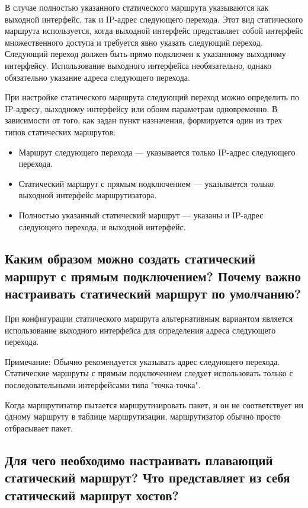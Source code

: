 В случае полностью указанного статического маршрута указываются
как выходной интерфейс, так и IP-адрес следующего перехода.
Этот вид статического маршрута используется,
когда выходной интерфейс представляет собой интерфейс множественного доступа
и требуется явно указать следующий переход.
Следующий переход должен быть прямо подключен
к указанному выходному интерфейсу.
Использование выходного интерфейса необязательно, однако
обязательно указание адреса следующего перехода.\par
При настройке статического маршрута следующий переход можно определить
по IP-адресу, выходному интерфейсу или обоим параметрам одновременно.
В зависимости от того, как задан пункт назначения,
формируется один из трех типов статических маршрутов:

\begin{itemize}
	\item Маршрут следующего перехода --- указывается только IP-адрес
		следующего перехода.
	\item Статический маршрут с прямым подключением --- указывается
		только выходной интерфейс маршрутизатора.
	\item Полностью указанный статический маршрут --- указаны и IP-адрес
		следующего перехода, и выходной интерфейс.
\end{itemize}

\subsection{Каким образом можно создать статический маршрут
	с прямым подключением?
	Почему важно настраивать статический маршрут по умолчанию?}

При конфигурации статического маршрута альтернативным вариантом
является использование выходного интерфейса для определения адреса
следующего перехода.\par
Примечание: Обычно рекомендуется указывать адрес следующего перехода.
Статические маршруты с прямым подключением следует использовать только
с последовательными интерфейсами типа "точка-точка".\par
Когда маршрутизатор пытается маршрутизировать пакет,
и он не соответствует ни одному маршруту в таблице маршрутизации,
маршрутизатор обычно просто отбрасывает пакет.

\subsection{Для чего необходимо настраивать плавающий статический маршрут?
	Что представляет из себя статический маршрут хостов?}

